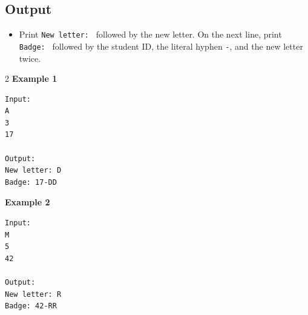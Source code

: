 \documentclass[12pt,oneside,openany]{article}
\begin{document}
\subsection*{Output}
\begin{itemize}
    \item Print \texttt{New letter: } followed by the new letter. On the next line, print \texttt{Badge: } followed by the student ID, the literal hyphen \texttt{-}, and the new letter twice.
\end{itemize}
\vspace{0.2cm}

\begin{example*}{}{}
\begin{multicols}{2}
\textbf{Example 1}
\begin{verbatim}
Input:
A
3
17

Output:
New letter: D
Badge: 17-DD
\end{verbatim}
\textbf{Example 2}
\begin{verbatim}
Input:
M
5
42

Output:
New letter: R
Badge: 42-RR
\end{verbatim}
\end{multicols}
\end{example*}
\end{document}
